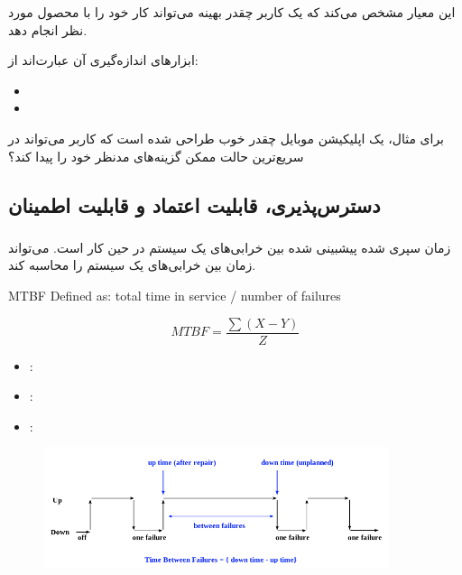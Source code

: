 این معیار مشخص می‌کند که یک کاربر چقدر بهینه می‌تواند کار خود را با محصول مورد
نظر انجام دهد.

ابزار‌های اندازه‌گیری آن عبارت‌اند از:

\begin{itemize}
    \item {}
    \item {}
\end{itemize}

برای مثال،  یک اپلیکیشن موبایل چقدر خوب طراحی شده است که
کاربر می‌تواند در سریع‌ترین حالت ممکن گزینه‌های مدنظر خود را پیدا کند؟

\subsection{دسترس‌پذیری، قابلیت اعتماد و قابلیت اطمینان}

\subsubsection{}

زمان سپری شده پیشبینی شده بین خرابی‌های یک سیستم در حین کار است. 
می‌تواند زمان بین خرابی‌های یک سیستم را محاسبه کند.

\begin{LTR}
    MTBF Defined as: total time in service / number of failures
\end{LTR}

\begin{equation}
    MTBF = \frac{\sum(X - Y)}{Z}
\end{equation}

\begin{itemize}
    \item {}: 
    \item {}: 
    \item {}: 
\end{itemize}

\begin{figure}[H]
    \centering
    \includegraphics[width=0.9\textwidth]{images/mtbf.png}
    \caption{}
    \label{fig:MTBFDiagram}
\end{figure}

